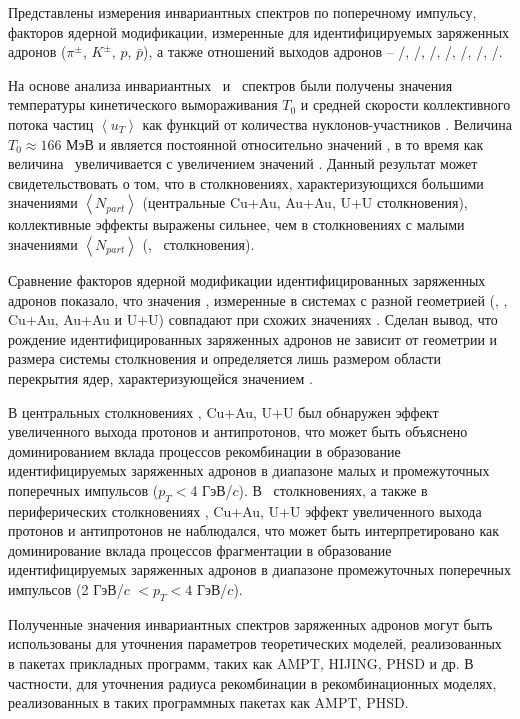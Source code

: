 Представлены измерения инвариантных спектров по поперечному импульсу, факторов ядерной модификации, измеренные для идентифицируемых заряженных адронов ($\pi^\pm$, $K^\pm$, $p$, $\bar{p}$), а также отношений выходов адронов -- \pim/\pip, \Km/\Kp, \prot/\aprot, \prot/\pip, \aprot/\pim, \Kp/\pip, \Km/\pim.

На основе анализа инвариантных \pt \ и \mt \ спектров были получены значения температуры кинетического вымораживания $T_{0}$ и средней скорости коллективного потока частиц $\left< u_T \right>$ как функций от количества нуклонов-участников \Npart.
Величина $T_{0}\approx166$ МэВ и является постоянной относительно значений \Npart, в то время как величина \ut \ увеличивается с увеличением значений \Npart. 
Данный результат может свидетельствовать о том, что в столкновениях, характеризующихся большими значениями $\left<N_{part}\right>$ (центральные Cu+Au, Au+Au, U+U столкновения), коллективные эффекты выражены сильнее, чем в столкновениях с малыми значениями $\left<N_{part}\right>$ (\pal, \heau \ столкновения).

Сравнение факторов ядерной модификации идентифицированных заряженных адронов показало, что значения \rab, измеренные в системах с разной геометрией (\dau, \heau, Cu+Au, Au+Au и U+U) совпадают при схожих значениях \Npart.
Сделан вывод, что рождение идентифицированных заряженных адронов не зависит от геометрии и размера системы столкновения и определяется лишь размером области перекрытия ядер, характеризующейся значением \Npart.

В центральных столкновениях \heau, Cu+Au, U+U был обнаружен эффект увеличенного выхода протонов и антипротонов, что может быть объяснено доминированием вклада процессов рекомбинации в образование идентифицируемых заряженных адронов в диапазоне малых и промежуточных поперечных импульсов ($p_{T}<4$ ГэВ/$c$). 
В \pal \ столкновениях, а также в периферических столкновениях \heau, Cu+Au, U+U эффект увеличенного выхода протонов и антипротонов не наблюдался, что может быть интерпретировано как доминирование вклада процессов фрагментации в образование идентифицируемых заряженных адронов в диапазоне промежуточных поперечных импульсов (2 ГэВ/$c$ $<p_{T}<4$ ГэВ/$c$).  

Полученные значения инвариантных спектров заряженных адронов могут быть использованы для уточнения параметров теоретических моделей, реализованных в пакетах прикладных программ, таких как  AMPT, HIJING, PHSD и др. В частности, для уточнения радиуса рекомбинации в рекомбинационных моделях, реализованных в таких программных пакетах как AMPT, PHSD.